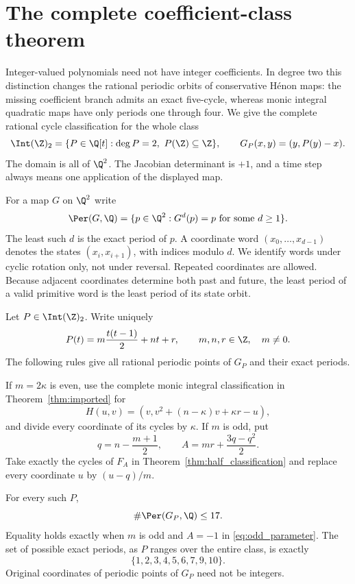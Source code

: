 \section{The complete coefficient-class theorem}
\label{sec:introduction}

Integer-valued polynomials need not have integer coefficients. In degree
two this distinction changes the rational periodic orbits of conservative
H\'enon maps: the missing coefficient branch admits an exact five-cycle,
whereas monic integral quadratic maps have only periods one through four.
We give the complete rational cycle classification for the whole class
\begin{equation}
 \Int(\Z)_2=\{P\in\Q[t]:\deg P=2,\ P(\Z)\subseteq\Z\},\qquad
 G_P(x,y)=(y,P(y)-x).
 \label{eq:class}
\end{equation}
The domain is all of $\Q^2$. The Jacobian determinant is $+1$,
and a time step always means one application of the displayed map.

For a map $G$ on $\Q^2$ write
\[
 \Per(G,\Q)=\{p\in\Q^2:G^d(p)=p\text{ for some }d\ge1\}.
\]
The least such $d$ is the exact period of $p$.
A coordinate word $(x_0,\ldots,x_{d-1})$ denotes the states
$(x_i,x_{i+1})$, with indices modulo $d$.
We identify words under cyclic rotation only, not under reversal.
Repeated coordinates are allowed. Because adjacent coordinates determine
both past and future, the least period of a valid primitive word is the
least period of its state orbit.

\begin{theorem}
\label{thm:whole_class}
Let $P\in\Int(\Z)_2$. Write uniquely
\begin{equation}
 P(t)=m\frac{t(t-1)}2+nt+r,
 \qquad m,n,r\in\Z,\quad m\ne0.
 \label{eq:newton}
\end{equation}
The following rules give all rational periodic points of $G_P$ and their
exact periods.

If $m=2\kappa$ is even, use the complete monic integral classification
in Theorem~\ref{thm:imported} for
\[
 H(u,v)=(v,v^2+(n-\kappa)v+\kappa r-u),
\]
and divide every coordinate of its cycles by $\kappa$.
If $m$ is odd, put
\begin{equation}
 q=n-\frac{m+1}{2},\qquad
 A=mr+\frac{3q-q^2}{2}.
 \label{eq:odd_parameter}
\end{equation}
Take exactly the cycles of $F_A$ in Theorem~\ref{thm:half_classification}
and replace every coordinate $u$ by $(u-q)/m$.

For every such $P$,
\begin{equation}
 \#\Per(G_P,\Q)\le17.
 \label{eq:bound17}
\end{equation}
Equality holds exactly when $m$ is odd and $A=-1$ in
\eqref{eq:odd_parameter}. The set of possible exact periods, as $P$
ranges over the entire class, is exactly
\begin{equation}
 \{1,2,3,4,5,6,7,9,10\}.
 \label{eq:periodset}
\end{equation}
Original coordinates of periodic points of $G_P$ need not be integers.
\end{theorem}

